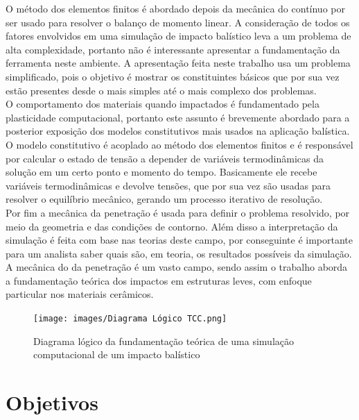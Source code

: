 O método dos elementos finitos é abordado depois da mecânica do contínuo por ser usado para resolver o balanço de momento linear. A consideração de todos os fatores envolvidos em uma simulação de impacto balístico leva a um problema de alta complexidade, portanto não é interessante apresentar a fundamentação da ferramenta neste ambiente. A apresentação feita neste trabalho usa um problema simplificado, pois o objetivo é mostrar os constituintes básicos que por sua vez estão presentes desde o mais simples até o mais complexo dos problemas. \\

O comportamento dos materiais quando impactados é fundamentado pela plasticidade computacional, portanto este assunto é brevemente abordado para a posterior exposição dos modelos constitutivos mais usados na aplicação balística. O modelo constitutivo é acoplado ao método dos elementos finitos e é responsável por calcular o estado de tensão a depender de variáveis termodinâmicas da solução em um certo ponto e momento do tempo. Basicamente ele recebe variáveis termodinâmicas e devolve tensões, que por sua vez são usadas para resolver o equilíbrio mecânico, gerando um processo iterativo de resolução. \\

Por fim a mecânica da penetração é usada para definir o problema resolvido, por meio da geometria e das condições de contorno. Além disso a interpretação da simulação é feita com base nas teorias deste campo, por conseguinte é importante para um analista saber quais são, em teoria, os resultados possíveis da simulação. A mecânica do da penetração é um vasto campo, sendo assim o trabalho aborda a fundamentação teórica dos impactos em estruturas leves, com enfoque particular nos materiais cerâmicos. 

\begin{figure}[H]
 	\caption{\label{fig:diagramalog} Diagrama lógico da fundamentação teórica de uma simulação computacional de um impacto balístico}
 	\centering
 	\texttt{[image: images/Diagrama Lógico TCC.png]}
 \end{figure} 
 


\section{Objetivos}

